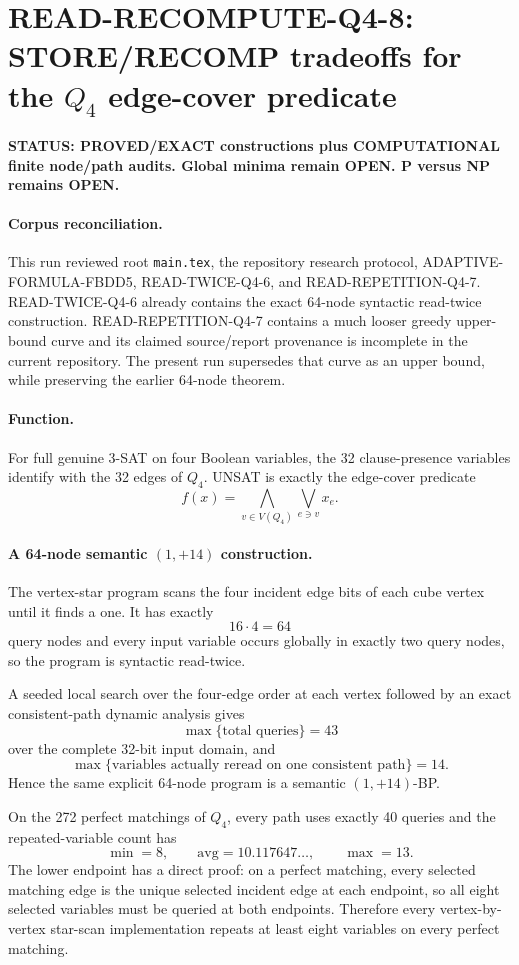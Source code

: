 \section*{READ-RECOMPUTE-Q4-8: STORE/RECOMP tradeoffs for the $Q_4$ edge-cover predicate}

\textbf{STATUS: PROVED/EXACT constructions plus COMPUTATIONAL finite node/path audits. Global minima remain OPEN. P versus NP remains OPEN.}

\paragraph{Corpus reconciliation.}
This run reviewed root \texttt{main.tex}, the repository research protocol, ADAPTIVE-FORMULA-FBDD5, READ-TWICE-Q4-6, and READ-REPETITION-Q4-7. READ-TWICE-Q4-6 already contains the exact 64-node syntactic read-twice construction. READ-REPETITION-Q4-7 contains a much looser greedy upper-bound curve and its claimed source/report provenance is incomplete in the current repository. The present run supersedes that curve as an upper bound, while preserving the earlier 64-node theorem.

\paragraph{Function.}
For full genuine 3-SAT on four Boolean variables, the 32 clause-presence variables identify with the 32 edges of $Q_4$. UNSAT is exactly the edge-cover predicate
\[
f(x)=\bigwedge_{v\in V(Q_4)}\bigvee_{e\ni v}x_e.
\]

\paragraph{A 64-node semantic $(1,+14)$ construction.}
The vertex-star program scans the four incident edge bits of each cube vertex until it finds a one. It has exactly
\[16\cdot4=64\]
query nodes and every input variable occurs globally in exactly two query nodes, so the program is syntactic read-twice.

A seeded local search over the four-edge order at each vertex followed by an exact consistent-path dynamic analysis gives
\[\max\{\text{total queries}\}=43\]
over the complete 32-bit input domain, and
\[\max\{\text{variables actually reread on one consistent path}\}=14.\]
Hence the same explicit 64-node program is a semantic $(1,+14)$-BP.

On the 272 perfect matchings of $Q_4$, every path uses exactly 40 queries and the repeated-variable count has
\[\min=8,\qquad \mathrm{avg}=10.117647\ldots,\qquad \max=13.\]
The lower endpoint has a direct proof: on a perfect matching, every selected matching edge is the unique selected incident edge at each endpoint, so all eight selected variables must be queried at both endpoints. Therefore every vertex-by-vertex star-scan implementation repeats at least eight variables on every perfect matching.

